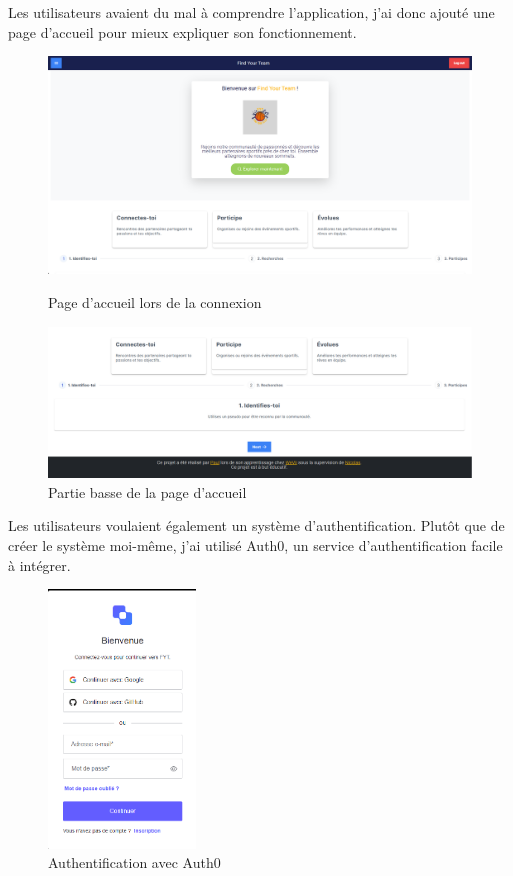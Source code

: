 Les utilisateurs avaient du mal à comprendre l'application, j'ai donc ajouté une page d'accueil pour mieux expliquer son fonctionnement.
\begin{figure}[ht]
    \centering
    \begin{minipage}{.45\textwidth}
        \centering
        \includegraphics[width=\linewidth]{image/fytLandingPage}
        \caption{Page d'accueil lors de la connexion}
        \label{fig:fytlp}
    \end{minipage}%
    \hfill
    \begin{minipage}{.45\textwidth}
        \centering
        \includegraphics[width=\linewidth]{image/fytLandingPageFooter}
        \caption{Partie basse de la page d'accueil}
        \label{fig:fytlpfooter}
    \end{minipage}
\end{figure}

Les utilisateurs voulaient également un système d'authentification. Plutôt que de créer le système moi-même, j'ai utilisé Auth0, un service d'authentification facile à intégrer.
\begin{figure}[H]
    \centering
    \includegraphics[width=0.35\textwidth]{image/fytAuth}
    \caption{Authentification avec Auth0}
    \label{fig:fytAuth}
\end{figure}

